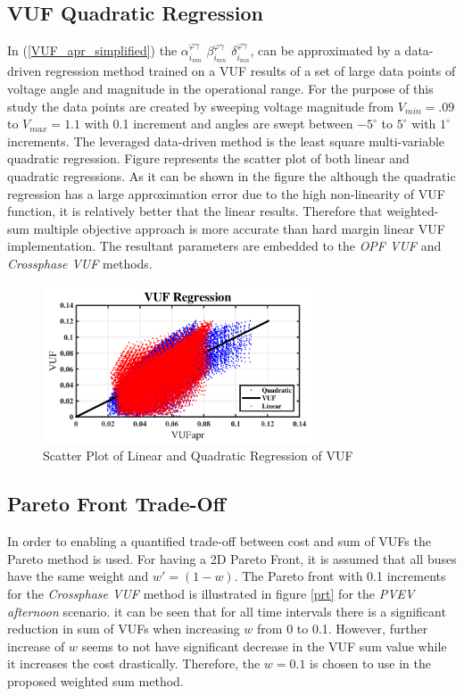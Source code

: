 \documentclass[journal]{IEEEtran}
\begin{document}
\subsection {VUF Quadratic Regression}\label{Reg}
In (\ref{VUF_apr_simplified}) the  $\alpha_{i_{mn}}^{\varphi\gamma}$ $\beta_{i_{mn}}^{\varphi\gamma}$
$\delta_{i_{mn}}^{\varphi\gamma}$, can be approximated by a data-driven regression method trained on a VUF results of a set of large data points of voltage angle and magnitude in the operational range. For the purpose of this study the data points are created by sweeping voltage magnitude from $V_{min}=.09$ to $V_{max}=1.1$ with 0.1 increment and angles are swept between $-5^{\circ}$ to $5^{\circ}$ with $1^{\circ}$ increments.  The leveraged data-driven method is the least square multi-variable quadratic regression. Figure \label{VUF_reg} represents the scatter plot of both linear and quadratic regressions. As it can be shown in the figure the although the quadratic regression has a large approximation error due to the high non-linearity of VUF function, it is relatively better that the linear results. Therefore that weighted-sum multiple objective approach is more accurate than hard margin linear VUF implementation. The resultant parameters are embedded to the \textit{OPF VUF} and \textit{Crossphase VUF} methods.
\begin{figure}
\centering
\includegraphics[width=8cm]{pdf/VUF_reg.pdf}
\vspace*{-0.3cm}
\caption{Scatter Plot of Linear and Quadratic Regression of VUF}
\label{VUF_reg}
\end{figure}

\subsection {Pareto Front Trade-Off}\label{Pareto}

In order to enabling a quantified trade-off between cost and sum of VUFs the Pareto method is used.  For having a 2D Pareto Front, it is assumed that all buses have the same weight and $w'=(1-w)$. The Pareto front with 0.1 increments for the \textit{Crossphase VUF} method is illustrated in figure \ref{prt} for the \textit{PVEV afternoon} scenario. it can be seen that for all time intervals there is a significant reduction in sum of VUFs when increasing $w$ from 0 to 0.1. However, further increase of $w$ seems to not have significant decrease in the VUF sum value while it increases the cost drastically. Therefore, the $w=0.1$ is chosen to use in the proposed weighted sum method.
\end{document}
